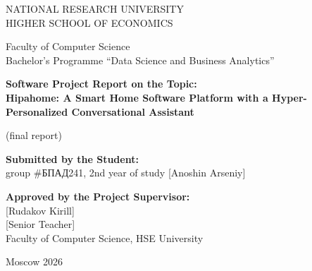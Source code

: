 \documentclass[a4paper,12pt]{article}
\begin{document}
\begin{titlepage}
\begin{center}
{\normalsize NATIONAL RESEARCH UNIVERSITY \\ HIGHER SCHOOL OF ECONOMICS}

\vspace{0.5cm}
{\normalsize Faculty of Computer Science \\ Bachelor's Programme ``Data Science and Business Analytics''}

\vspace{4cm}

{\bfseries\large Software Project Report on the Topic:\\[6pt]
Hipahome: A Smart Home Software Platform with a Hyper-Personalized Conversational Assistant}

\vspace{4pt}
{\normalsize (final report)}

\end{center}

\vspace{3cm}

\noindent\textbf{Submitted by the Student:}\\[4pt]
\hspace*{0.5cm} group \foreignlanguage{russian}{\#БПАД241}, 2nd year of study \hspace{1.2cm} [Anoshin Arseniy]

\vspace{0.8cm}

\noindent\textbf{Approved by the Project Supervisor:}\\[4pt]
\hspace*{0.5cm} [Rudakov Kirill]\\
\hspace*{0.5cm} [Senior Teacher]\\
\hspace*{0.5cm} Faculty of Computer Science, HSE University

\vfill
\begin{center}
Moscow 2026
\end{center}
\end{titlepage}

\renewcommand{\contentsname}{\textbf{Содержание}}
\tableofcontents
\thispagestyle{empty}
\newpage
\end{document}
